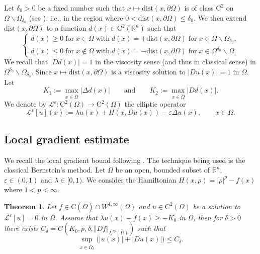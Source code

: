 \documentclass[11pt,reqno]{amsart}
\numberwithin{figure}{section}
\theoremstyle{plain}
\newtheorem{thm}{Theorem}[section]
\theoremstyle{remark}
\numberwithin{equation}{section}
\newcommand{\R}{\mathbb{R}}
\newcommand{\rmC}{\mathrm{C}}
\begin{document}
\noindent Let $\delta_0>0$ be a fixed number such that $x\mapsto \mathrm{dist}(x,\partial\Omega)$ is of class $\mathrm{C}^2$ on $\Omega\backslash \Omega_{\delta_0}$ (see \cite{gilbarg_elliptic_2001}), i.e., in the region where $0<\mathrm{dist}(x,\partial\Omega) \leq \delta_0$. We then extend $\mathrm{dist}(x,\partial\Omega)$ to a function $d(x)\in \mathrm{C}^2(\mathbb{R}^n)$ such that 
\begin{equation}\label{e:distance_def}
    \begin{cases}
    d(x)\geq 0\;\text{for}\;x\in\Omega\;\text{with}\;d(x) = +\mathrm{dist}(x,\partial\Omega)\;\text{for}\;x\in \Omega\backslash \Omega_{\delta_0},\\
    d(x)\leq 0\;\text{for}\;x\notin \Omega\;\text{with}\;d(x) = -\mathrm{dist}(x,\partial\Omega)\;\text{for}\;x\in \Omega^{\delta_0}\backslash \Omega.
    \end{cases}
\end{equation}
We recall that $|D d(x)| = 1$ in the viscosity sense (and thus in classical sense) in $\Omega^{\delta_0}\backslash \Omega_{\delta_0}$. Since $x\mapsto \mathrm{dist}(x,\partial \Omega)$ is a viscosity solution to $|Du(x)|=1$ in $\Omega$. %
Let 
\begin{equation*}
    K_1 := \max_{x\in \overline{\Omega}} |\Delta d(x)| \qquad\text{and}\qquad K_2 := \max_{x\in \overline{\Omega}} |D d(x)|.
\end{equation*}
\noindent We denote by $\mathcal{L}^\varepsilon:\rmC^2(\Omega)\to \rmC^2(\Omega)$ the elliptic operator
\begin{equation*}
    \mathcal{L}^\varepsilon[u](x) := \lambda u(x) + H(x,Du(x)) - \varepsilon \Delta u(x), \qquad x\in \Omega.
\end{equation*}



\subsection{Local gradient estimate} 
We recall the local gradient bound following \cite[Appendix]{Lasry1989}. The technique being used is the classical Bernstein's method. Let $\Omega$ be an open, bounded subset of $\R^n$, $\varepsilon \in (0,1)$ and $\lambda \in [0,1)$. We consider the Hamiltonian $H(x,\rho) = |\rho|^p - f(x)$ where $1<p < \infty$.

\begin{thm}\label{thm:grad_1} Let $f\in \rmC(\overline{\Omega})\cap W^{1,\infty}(\Omega)$ and $u\in \mathrm{C}^2(\Omega)$ be a solution to $\mathcal{L}^\varepsilon[u] = 0$ in $\Omega$. Assume that $\lambda u(x)-f(x)\geq -K_0$ in $\Omega$, then for $\delta>0$ there exists $C_\delta = C(K_0,p,\delta, \Vert D f\Vert_{L^\infty(\Omega)})$ such that 
\begin{equation*}
    \sup_{x\in \overline{\Omega}_\delta} \Big(|u(x)|+|Du(x)|\Big) \leq C_\delta.
\end{equation*}
\end{thm}
\end{document}
